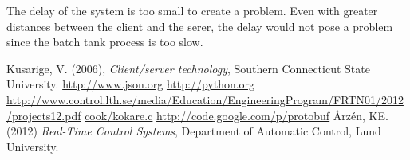 \documentclass{article}
\begin{document}
The delay of the system is too small to create a problem. Even with greater distances between the client and the serer, the delay would not pose a problem since the batch tank process is too slow.

\newpage

\begin{thebibliography}{9}
Kusarige, V. (2006), \emph{Client/server technology}, Southern Connecticut State University.
\url{http://www.json.org}
\url{http://python.org}
\url{http://www.control.lth.se/media/Education/EngineeringProgram/FRTN01/2012/projects12.pdf}
\url{cook/kokare.c}
\url{http://code.google.com/p/protobuf}
Årzén, KE. (2012) \emph{Real-Time Control Systems}, Department of
Automatic Control, Lund University.
\end{thebibliography}
\end{document}
